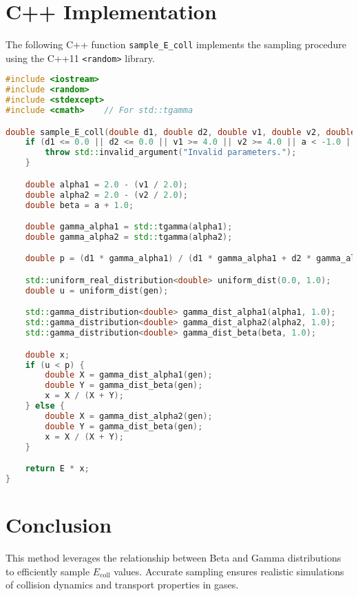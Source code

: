 \section{C++ Implementation}

The following C++ function \texttt{sample\_E\_coll} implements the sampling procedure using the C++11 \texttt{<random>} library.

\begin{lstlisting}[language=C++,caption={C++ Implementation of Collision Energy Sampling}]
#include <iostream>
#include <random>
#include <stdexcept>
#include <cmath>    // For std::tgamma

double sample_E_coll(double d1, double d2, double v1, double v2, double a, double E, std::mt19937 &gen) {
    if (d1 <= 0.0 || d2 <= 0.0 || v1 >= 4.0 || v2 >= 4.0 || a < -1.0 || E <= 0.0) {
        throw std::invalid_argument("Invalid parameters.");
    }

    double alpha1 = 2.0 - (v1 / 2.0);
    double alpha2 = 2.0 - (v2 / 2.0);
    double beta = a + 1.0;

    double gamma_alpha1 = std::tgamma(alpha1);
    double gamma_alpha2 = std::tgamma(alpha2);

    double p = (d1 * gamma_alpha1) / (d1 * gamma_alpha1 + d2 * gamma_alpha2);

    std::uniform_real_distribution<double> uniform_dist(0.0, 1.0);
    double u = uniform_dist(gen);

    std::gamma_distribution<double> gamma_dist_alpha1(alpha1, 1.0);
    std::gamma_distribution<double> gamma_dist_alpha2(alpha2, 1.0);
    std::gamma_distribution<double> gamma_dist_beta(beta, 1.0);

    double x;
    if (u < p) {
        double X = gamma_dist_alpha1(gen);
        double Y = gamma_dist_beta(gen);
        x = X / (X + Y);
    } else {
        double X = gamma_dist_alpha2(gen);
        double Y = gamma_dist_beta(gen);
        x = X / (X + Y);
    }

    return E * x;
}
\end{lstlisting}

\section{Conclusion}

This method leverages the relationship between Beta and Gamma distributions to efficiently sample \( E_{\text{coll}} \) values. Accurate sampling ensures realistic simulations of collision dynamics and transport properties in gases.
